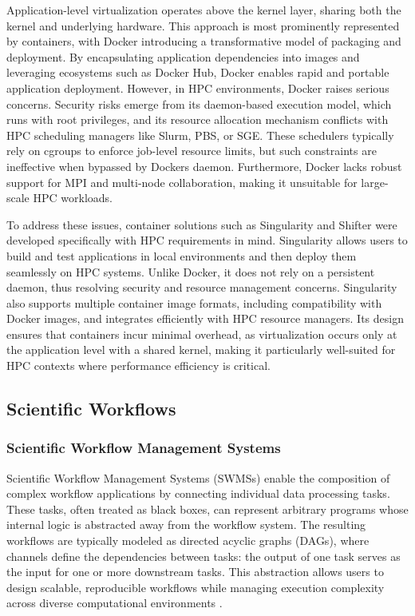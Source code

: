 Application-level virtualization operates above the kernel layer, sharing both the kernel and underlying hardware. This approach is most prominently represented by containers, with Docker introducing a transformative model of packaging and deployment. By encapsulating application dependencies into images and leveraging ecosystems such as Docker Hub, Docker enables rapid and portable application deployment. However, in HPC environments, Docker raises serious concerns. Security risks emerge from its daemon-based execution model, which runs with root privileges, and its resource allocation mechanism conflicts with HPC scheduling managers like Slurm, PBS, or SGE. These schedulers typically rely on cgroups to enforce job-level resource limits, but such constraints are ineffective when bypassed by Dockers daemon. Furthermore, Docker lacks robust support for MPI and multi-node collaboration, making it unsuitable for large-scale HPC workloads.

To address these issues, container solutions such as Singularity and Shifter were developed specifically with HPC requirements in mind. Singularity allows users to build and test applications in local environments and then deploy them seamlessly on HPC systems. Unlike Docker, it does not rely on a persistent daemon, thus resolving security and resource management concerns. Singularity also supports multiple container image formats, including compatibility with Docker images, and integrates efficiently with HPC resource managers. Its design ensures that containers incur minimal overhead, as virtualization occurs only at the application level with a shared kernel, making it particularly well-suited for HPC contexts where performance efficiency is critical.


\subsection{Scientific Workflows}
\label{sec:background_workflows}

\subsubsection{Scientific Workflow Management Systems}
\label{sec:background_workflows_swms}
Scientific Workflow Management Systems (SWMSs) enable the composition of complex workflow applications by connecting individual data processing tasks. These tasks, often treated as black boxes, can represent arbitrary programs whose internal logic is abstracted away from the workflow system. The resulting workflows are typically modeled as directed acyclic graphs (DAGs), where channels define the dependencies between tasks: the output of one task serves as the input for one or more downstream tasks. This abstraction allows users to design scalable, reproducible workflows while managing execution complexity across diverse computational environments \cite{thamsen2025energyawareworkflowexecutionoverview}.

